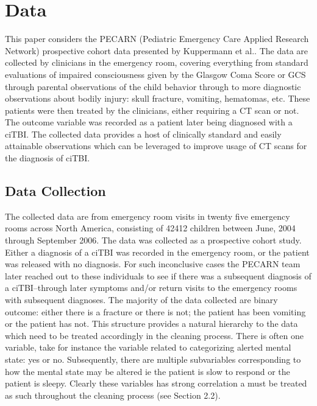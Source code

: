 \documentclass[10pt,letterpaper]{article}
\begin{document}
\section{Data}\label{data}

This paper considers the PECARN (Pediatric Emergency Care Applied Research Network) prospective cohort data presented by Kuppermann et al.\cite{kuppermann_identification_2009}. The data are collected by clinicians in the emergency room, covering everything from standard evaluations of impaired consciousness given by the Glasgow Coma Score or GCS\cite{Teasdale1974} through parental observations of the child behavior through to more diagnostic observations about bodily injury: skull fracture, vomiting, hematomas, etc. These patients were then treated by the clinicians, either requiring a CT scan or not. The outcome variable was recorded as a patient later being diagnosed with a ciTBI. The collected data provides a host of clinically standard and easily attainable observations which can be leveraged to improve usage of CT scans for the diagnosis of ciTBI. 

\subsection{Data Collection}\label{data-collection}
The collected data are from emergency room visits in twenty five emergency rooms across North America, consisting of 42412 children between June, 2004 through September 2006. The data was collected as a prospective cohort study. Either a diagnosis of a ciTBI was recorded in the emergency room, or the patient was released with no diagnosis. For such inconclusive cases the PECARN team later reached out to these individuals to see if there was a subsequent diagnosis of a ciTBI--through later symptoms and/or return visits to the emergency rooms with subsequent diagnoses. The majority of the data collected are binary outcome: either there is a fracture or there is not; the patient has been vomiting or the patient has not. This structure provides a natural hierarchy to the data which need to be treated accordingly in the cleaning process. There is often one variable, take for instance the variable related to categorizing alerted mental state: yes or no. Subsequently, there are multiple subvariables corresponding to how the mental state may be altered ie the patient is slow to respond or the patient is sleepy. Clearly these variables has strong correlation a must be treated as such throughout the cleaning process (see Section 2.2).\\
\end{document}
